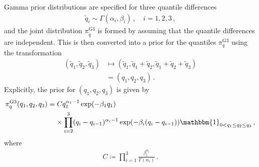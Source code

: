 \documentclass{article}
\begin{document}
%
Gamma prior distributions are specified for three quantile differences
%
\begin{align*}
	\tilde{q}_i \sim \Gamma(\alpha_i, \beta_i) \,, \quad i = 1, 2, 3 \,,
\end{align*}
%
and the joint distribution $\pi_{\tilde{q}}^{\text{G3}}$
is formed by assuming that the quantile differences are independent.
This is then converted into a prior for the quantiles
$\pi_q^{\text{G3}}$ using the transformation
%
\begin{align*}
	(\tilde{q}_1, \tilde{q}_2, \tilde{q}_3)
		&\mapsto (\tilde{q}_1, \tilde{q}_1 + \tilde{q}_2, \tilde{q}_1
		+ \tilde{q}_2 + \tilde{q}_3)\\
	&=(q_1, q_2, q_3)\,.
\end{align*}
%
Explicitly, the prior for $(q_1, q_2, q_3)$ is given by
%
\begin{align}
	\pi^{\text{G3}}_q(q_{1}, q_{2}, q_{3})
		&= C q_{1} ^ {\alpha_1 - 1} \exp(-\beta_1 q_{1}) \nonumber\\
	&\ \phantom{=} \times \prod^{3}_{i=2} (q_{i}-q_{i - 1}) ^ {\alpha_i - 1}
		\exp(-\beta_i(q_i - q_{i - 1}))
		\mathbbm{1}_{0 < q_1 \leq q_2 \leq q_3} \,,
	\label{eq:prior-1}
\end{align}
%
where
%
\begin{align*}
	C \coloneqq \prod_{i = 1}^3 \frac{\beta ^ {\alpha_i}_i}{\Gamma(\alpha_i)} \,.
\end{align*}
%
\end{document}
